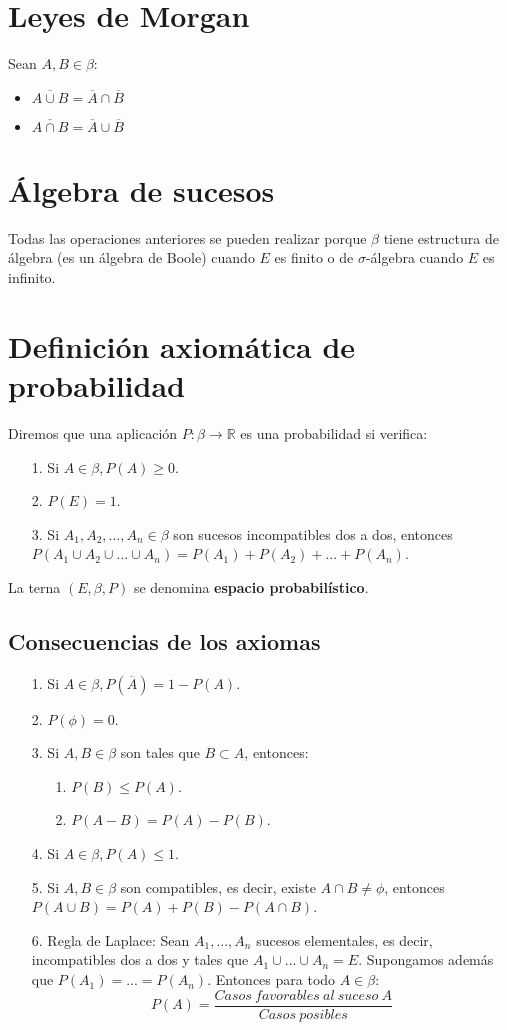 \documentclass[12pt,a4paper,oneside,onecolumn,titlepage]{book}
\begin{document}
\section{Leyes de Morgan}
Sean $A, B \in \beta$:
\begin{itemize}
\item $\overline{A \cup B} = \overline{A} \cap \overline{B}$
\item $\overline{A \cap B} = \overline{A} \cup \overline{B}$
\end{itemize}


\section{Álgebra de sucesos}
Todas las operaciones anteriores se pueden realizar porque $\beta$ tiene estructura de álgebra (es un álgebra de Boole) cuando $E$ es finito o de $\sigma$-álgebra cuando $E$ es infinito.


\section{Definición axiomática de probabilidad}
Diremos que una aplicación $P: \beta \rightarrow \mathbb{R}$ es una probabilidad si verifica:
\begin{itemize}
\item[1.]Si $A \in \beta, P(A) \geq 0$.
\item[2.]$P(E) = 1$.
\item[3.]Si $A_{1},A_{2},...,A_{n} \in \beta$ son sucesos incompatibles dos a dos, entonces $P(A_{1} \cup A_{2} \cup ... \cup A_{n}) = P(A_{1}) + P(A_{2}) + ... + P(A_{n})$.
\end{itemize}
La terna $(E,\beta,P)$ se denomina \textbf{espacio probabilístico}.

\subsection{Consecuencias de los axiomas}
\begin{itemize}
\item[1.]Si $A \in \beta, P(\overline{A}) = 1 - P(A)$.
\item[2.]$P(\phi)=0$.
\item[3.]Si $A,B \in \beta$ son tales que $B \subset A$, entonces:
\begin{itemize}
\item[1.]$P(B) \leq P(A)$.
\item[2.]$P(A-B)=P(A)-P(B)$.
\end{itemize}
\item[4.]Si $A \in \beta, P(A)\leq1$.
\item[5.]Si $A, B \in \beta$ son compatibles, es decir, existe $A \cap B \neq \phi$, entonces $P(A \cup B)=P(A)+P(B)-P(A \cap B)$.
\item[6.]Regla de Laplace: Sean $A_{1},...,A_{n}$ sucesos elementales, es decir, incompatibles dos a dos y tales que $A_{1} \cup ... \cup A_{n} = E$. Supongamos además que $P(A_{1})=...=P(A_{n})$. Entonces para todo $A \in \beta$:
\[P(A)= \frac{Casos\:favorables\:al\:suceso\:A}{Casos\:posibles}\]
\end{itemize}
\end{document}
